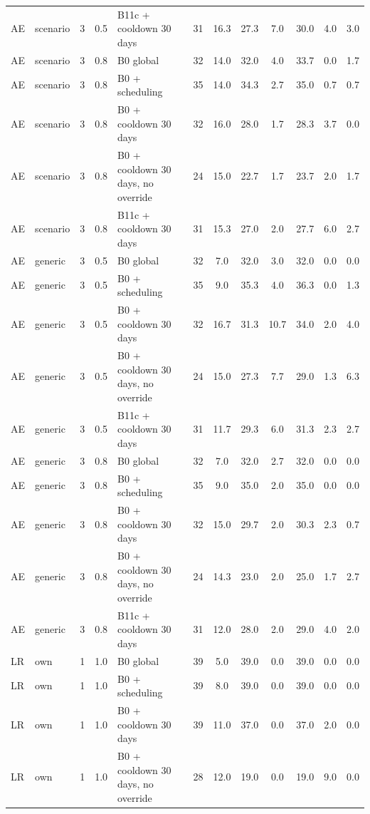 \begin{longtable}{lllllccccccc}
AE & scenario & 3 & 0.5 & B11c + cooldown 30 days & 31 & 16.3 & 27.3 & 7.0 & 30.0 & 4.0 & 3.0 \\
AE & scenario & 3 & 0.8 & B0 global & 32 & 14.0 & 32.0 & 4.0 & 33.7 & 0.0 & 1.7 \\
AE & scenario & 3 & 0.8 & B0 + scheduling & 35 & 14.0 & 34.3 & 2.7 & 35.0 & 0.7 & 0.7 \\
AE & scenario & 3 & 0.8 & B0 + cooldown 30 days & 32 & 16.0 & 28.0 & 1.7 & 28.3 & 3.7 & 0.0 \\
AE & scenario & 3 & 0.8 & B0 + cooldown 30 days, no override & 24 & 15.0 & 22.7 & 1.7 & 23.7 & 2.0 & 1.7 \\
AE & scenario & 3 & 0.8 & B11c + cooldown 30 days & 31 & 15.3 & 27.0 & 2.0 & 27.7 & 6.0 & 2.7 \\
AE & generic & 3 & 0.5 & B0 global & 32 & 7.0 & 32.0 & 3.0 & 32.0 & 0.0 & 0.0 \\
AE & generic & 3 & 0.5 & B0 + scheduling & 35 & 9.0 & 35.3 & 4.0 & 36.3 & 0.0 & 1.3 \\
AE & generic & 3 & 0.5 & B0 + cooldown 30 days & 32 & 16.7 & 31.3 & 10.7 & 34.0 & 2.0 & 4.0 \\
AE & generic & 3 & 0.5 & B0 + cooldown 30 days, no override & 24 & 15.0 & 27.3 & 7.7 & 29.0 & 1.3 & 6.3 \\
AE & generic & 3 & 0.5 & B11c + cooldown 30 days & 31 & 11.7 & 29.3 & 6.0 & 31.3 & 2.3 & 2.7 \\
AE & generic & 3 & 0.8 & B0 global & 32 & 7.0 & 32.0 & 2.7 & 32.0 & 0.0 & 0.0 \\
AE & generic & 3 & 0.8 & B0 + scheduling & 35 & 9.0 & 35.0 & 2.0 & 35.0 & 0.0 & 0.0 \\
AE & generic & 3 & 0.8 & B0 + cooldown 30 days & 32 & 15.0 & 29.7 & 2.0 & 30.3 & 2.3 & 0.7 \\
AE & generic & 3 & 0.8 & B0 + cooldown 30 days, no override & 24 & 14.3 & 23.0 & 2.0 & 25.0 & 1.7 & 2.7 \\
AE & generic & 3 & 0.8 & B11c + cooldown 30 days & 31 & 12.0 & 28.0 & 2.0 & 29.0 & 4.0 & 2.0 \\
LR & own & 1 & 1.0 & B0 global & 39 & 5.0 & 39.0 & 0.0 & 39.0 & 0.0 & 0.0 \\
LR & own & 1 & 1.0 & B0 + scheduling & 39 & 8.0 & 39.0 & 0.0 & 39.0 & 0.0 & 0.0 \\
LR & own & 1 & 1.0 & B0 + cooldown 30 days & 39 & 11.0 & 37.0 & 0.0 & 37.0 & 2.0 & 0.0 \\
LR & own & 1 & 1.0 & B0 + cooldown 30 days, no override & 28 & 12.0 & 19.0 & 0.0 & 19.0 & 9.0 & 0.0 \\

\end{longtable}
